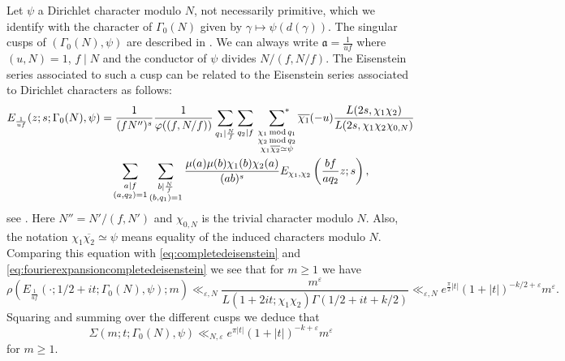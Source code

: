 \documentclass{article}
\theoremstyle{named}
\newcommand{\psum}{\sideset{}{^*}\sum}
\renewcommand{\a}{\mathfrak{a}}
\DeclareMathOperator{\modulo}{mod}
\begin{document}
Let $\psi$ a Dirichlet character modulo $N$, not necessarily primitive, which we identify with the character of $\Gamma_0(N)$ given by $\gamma \mapsto \psi(d(\gamma))$. The singular cusps of $(\Gamma_0(N), \psi)$ are described in \cite[section 5]{youngeisensteinseries}. We can always write $\a = \frac{1}{uf}$ where $(u, N) = 1$, $f\mid N$ and the conductor of $\psi$ divides $N/(f, N/f)$. The Eisenstein series associated to such a cusp can be related to the Eisenstein series associated to Dirichlet characters as follows:
\begin{equation*}
\begin{aligned}
E_{\frac{1}{uf}}(z; s; \Gamma_0(N), \psi) & = \frac{1}{(fN'')^s}\frac{1}{\varphi((f, N/f))}\sum_{q_1 \mid \frac{N}{f}}\sum_{q_2 \mid f}\, \, \,  \psum_{\substack{\chi_1 \modulo q_1\\
\chi_2 \modulo q_2\\
\chi_1 \overline{\chi_2} \simeq \psi}} \overline{\chi_1}(-u)\frac{L(2s, \chi_1 \chi_2)}{L(2s, \chi_1\chi_2 \chi_{0, N})}\\
& \quad \sum_{\substack{a \mid f\\
(a, q_2) = 1}}\sum_{\substack{b \mid \frac{N}{f}\\
(b, q_1) = 1}}\frac{\mu(a)\mu(b)\chi_1(b)\chi_2(a)}{(ab)^s}E_{\chi_1, \chi_2}\left(\frac{bf}{aq_2}z; s\right),
\end{aligned}
\end{equation*}
see \cite[Theorem 6.1]{youngeisensteinseries}. Here $N'' = N'/(f, N')$ and $\chi_{0, N}$ is the trivial character modulo $N$. Also, the notation $\chi_1 \overline{\chi_2} \simeq \psi$ means equality of the induced characters modulo $N$. Comparing this equation with \eqref{eq:completedeisenstein} and \eqref{eq:fourierexpansioncompletedeisenstein} we see that for $m \geq 1$ we have
\begin{equation*}
    \rho\left(E_{\frac{1}{uf}}(\cdot; 1/2 + it; \Gamma_0(N), \psi); m\right) \ll_{\varepsilon, N} \frac{m^\varepsilon}{L(1 + 2it; \chi_1 \chi_2) \Gamma(1/2 + it + k/2)} \ll_{\varepsilon, N} e^{\frac{\pi}{2}|t|}(1 + |t|)^{-k/2 + \varepsilon} m^\varepsilon.
\end{equation*}
Squaring and summing over the different cusps we deduce that 
\begin{equation}\label{eq:boundfouriereisensteinhecke}
    \Sigma(m; t; \Gamma_0(N), \psi) \ll_{N, \varepsilon} e^{\pi |t|}(1 + |t|)^{-k + \varepsilon} m^\varepsilon
\end{equation}
for $m \geq 1$.
\end{document}
